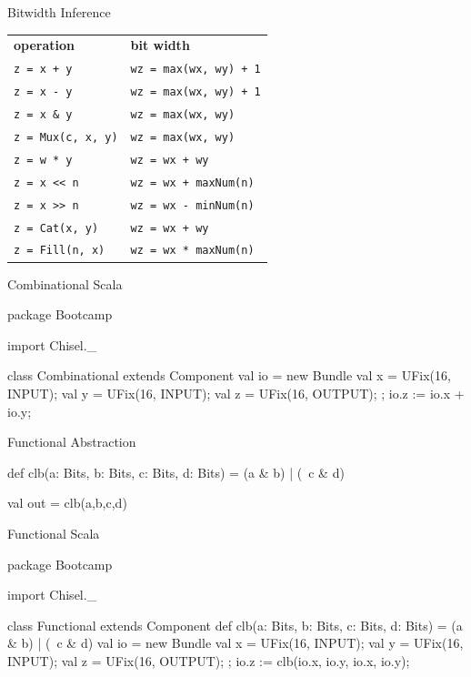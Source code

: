 \documentclass[xcolor=pdflatex,dvipsnames,table]{beamer}
\begin{document}
\begin{frame}[fragile]{Bitwidth Inference}
\begin{center}
\begin{tabular}{ll}
{\bf operation} & {\bf bit width} \\ 
\verb|z = x + y| & \verb|wz = max(wx, wy) + 1| \\
\verb+z = x - y+ & \verb|wz = max(wx, wy) + 1|\\
\verb+z = x & y+ & \verb+wz = max(wx, wy)+ \\
\verb+z = Mux(c, x, y)+ & \verb+wz = max(wx, wy)+ \\
\verb+z = w * y+ & \verb!wz = wx + wy! \\
\verb+z = x << n+ & \verb!wz = wx + maxNum(n)! \\
\verb+z = x >> n+ & \verb+wz = wx - minNum(n)+ \\
\verb+z = Cat(x, y)+ & \verb!wz = wx + wy! \\
\verb+z = Fill(n, x)+ & \verb+wz = wx * maxNum(n)+ \\
\end{tabular}
\end{center}
\end{frame}

\begin{frame}[fragile]{Combinational Scala}
\begin{scala}
package Bootcamp {

import Chisel._

class Combinational extends Component {
  val io = new Bundle {
    val x = UFix(16, INPUT);
    val y = UFix(16, INPUT);
    val z = UFix(16, OUTPUT);
  };
  io.z := io.x + io.y;
}

}
\end{scala}
\end{frame}

\begin{frame}[fragile]{Functional Abstraction}
\begin{scala}
def clb(a: Bits, b: Bits, c: Bits, d: Bits) = 
  (a & b) | (~c & d)

val out = clb(a,b,c,d)
\end{scala}
\end{frame}

\begin{frame}{Functional Scala}
\begin{scala}
package Bootcamp {

import Chisel._

class Functional extends Component {
  def clb(a: Bits, b: Bits, c: Bits, d: Bits) = 
    (a & b) | (~c & d)
  val io = new Bundle {
    val x = UFix(16, INPUT);
    val y = UFix(16, INPUT);
    val z = UFix(16, OUTPUT);
  };
  io.z := clb(io.x, io.y, io.x, io.y);
}

}
\end{scala}
\end{frame}
\end{document}
